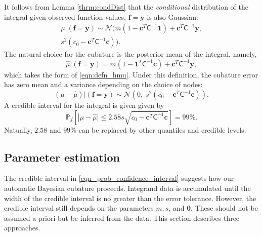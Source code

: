 \documentclass[twocolumn]{svjour3}          %
\newcommand{\bm}[1]{\boldsymbol{#1}}
\newcommand{\vtheta}{{\bm{\theta}}}
\newcommand{\vc}{\bm{c}}
\newcommand{\vf}{\bm{f}}
\newcommand{\vy}{\bm{y}}
\newcommand{\vone}{\bm{1}}
\newcommand{\mC}{\mathsf{C}}
\newcommand{\calN}{\mathcal{N}}
\newcommand{\hmu}{\widehat{\mu}}
\begin{document}
It follows from Lemma \ref{thrm:condDist} that the \emph{conditional} distribution of the integral given observed function values, $\vf = \vy$ is also Gaussian:
\begin{multline} \label{eqn:condInteg}
\mu | (\vf = \vy) \sim \calN \bigl(m (1 - \vc^T \mC^{-1} \vone)  + \vc^T \mC^{-1} \vy, 
\\
s^2(c_0  -\vc ^T \mC^{-1} \vc) \bigr).
\end{multline}
The natural choice for  the cubature is the posterior mean of the integral, namely, 
\begin{equation}
\label{eqn:BayesCub}
\widehat{\mu}  \vert ( \vf = \vy)
= m(1 - \vone^T  \mC^{-1}\vc )
+ \vc^T \mC^{-1} \vy,
\end{equation}
which takes the form of \eqref{eqn:defn_hmu}.
Under this definition, the cubature error has zero mean and a variance depending on the choice of nodes:
\begin{equation*}
(\mu-\hmu) | (\vf = \vy)
 \sim  \calN 
\left(
0, \;
s^2 (c_0 - \vc^T\mC^{-1}\vc) 
\right).
\end{equation*}
A credible interval for the integral is given given by 
\begin{equation}
\label{eqn_prob_confidence_interval}
\mathbb{P}_f \left[
|\mu-\hmu| \leq  2.58 s \sqrt{c_0 - \vc^T\mC^{-1}\vc } 
\right] = 99\%.
\end{equation}
Natually, $2.58$ and $99\%$ can be replaced by other quantiles and credible levels.


\subsection{Parameter estimation}
The credible interval in \eqref{eqn_prob_confidence_interval} suggests how our automatic Bayesian cubature proceeds.  Integrand data is accumulated until the width of the credible interval is no greater than the error tolerance.  However, the credible interval still depends on the parameters $m, s$, and $\vtheta$.  These should not be assumed a priori but be inferred from the data.  This section describes three approaches.
\end{document}
